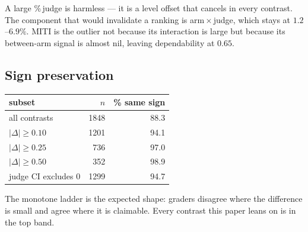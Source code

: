 A large \%\,judge is harmless --- it is a level offset that cancels in every contrast. The
component that would invalidate a ranking is arm\,$\times$\,judge, which stays at $1.2$--$6.9\%$.
MITI is the outlier not because its interaction is large but because its between-arm signal is
almost nil, leaving dependability at $0.65$.

\subsection{Sign preservation}
\begin{center}\small
\begin{tabular}{@{}lrr@{}}
\toprule
subset & $n$ & \% same sign \\
\midrule
all contrasts        & 1848 & 88.3 \\
$|\Delta|\geq0.10$   & 1201 & 94.1 \\
$|\Delta|\geq0.25$   &  736 & 97.0 \\
$|\Delta|\geq0.50$   &  352 & 98.9 \\
judge CI excludes 0  & 1299 & 94.7 \\
\bottomrule
\end{tabular}
\end{center}

The monotone ladder is the expected shape: graders disagree where the difference is small and
agree where it is claimable. Every contrast this paper leans on is in the top band.
